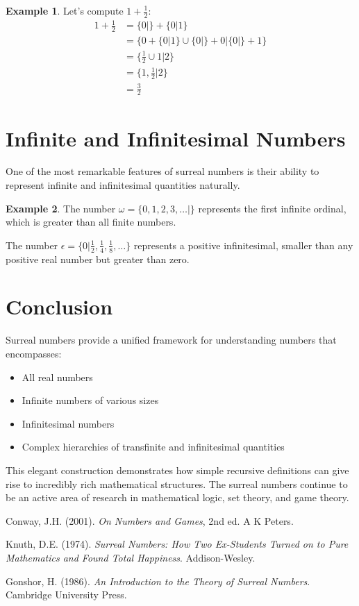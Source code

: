 \documentclass[11pt,a4paper]{article}
\theoremstyle{definition}
\newtheorem{example}{Example}[section]
\begin{document}
\begin{example}
Let's compute $1 + \frac{1}{2}$:
\begin{align}
1 + \frac{1}{2} &= \{0|\} + \{0|1\} \\
&= \{0 + \{0|1\} \cup \{0|\} + 0 | \{0|\} + 1\} \\
&= \{\frac{1}{2} \cup 1 | 2\} \\
&= \{1, \frac{1}{2} | 2\} \\
&= \frac{3}{2}
\end{align}
\end{example}

\section{Infinite and Infinitesimal Numbers}

One of the most remarkable features of surreal numbers is their ability to represent infinite and infinitesimal quantities naturally.

\begin{example}
The number $\omega = \{0, 1, 2, 3, \ldots | \}$ represents the first infinite ordinal, which is greater than all finite numbers.

The number $\epsilon = \{0 | \frac{1}{2}, \frac{1}{4}, \frac{1}{8}, \ldots\}$ represents a positive infinitesimal, smaller than any positive real number but greater than zero.
\end{example}

\section{Conclusion}

Surreal numbers provide a unified framework for understanding numbers that encompasses:
\begin{itemize}
    \item All real numbers
    \item Infinite numbers of various sizes  
    \item Infinitesimal numbers
    \item Complex hierarchies of transfinite and infinitesimal quantities
\end{itemize}

This elegant construction demonstrates how simple recursive definitions can give rise to incredibly rich mathematical structures. The surreal numbers continue to be an active area of research in mathematical logic, set theory, and game theory.

\begin{thebibliography}{9}
Conway, J.H. (2001). \emph{On Numbers and Games}, 2nd ed. A K Peters.

Knuth, D.E. (1974). \emph{Surreal Numbers: How Two Ex-Students Turned on to Pure Mathematics and Found Total Happiness}. Addison-Wesley.

Gonshor, H. (1986). \emph{An Introduction to the Theory of Surreal Numbers}. Cambridge University Press.
\end{thebibliography}
\end{document}
